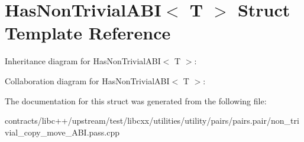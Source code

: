 \hypertarget{struct_has_non_trivial_a_b_i}{}\section{Has\+Non\+Trivial\+A\+BI$<$ T $>$ Struct Template Reference}
\label{struct_has_non_trivial_a_b_i}


Inheritance diagram for Has\+Non\+Trivial\+A\+BI$<$ T $>$\+:


Collaboration diagram for Has\+Non\+Trivial\+A\+BI$<$ T $>$\+:


The documentation for this struct was generated from the following file\+:\begin{DoxyCompactItemize}
\item 
contracts/libc++/upstream/test/libcxx/utilities/utility/pairs/pairs.\+pair/non\+\_\+trivial\+\_\+copy\+\_\+move\+\_\+\+A\+B\+I.\+pass.\+cpp\end{DoxyCompactItemize}
